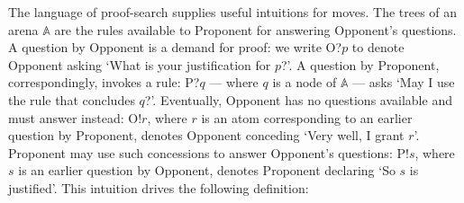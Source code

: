 \documentclass{lipics-v2021}
\newcommand{\arena}[1]{\mathbb{#1}}                     %
\begin{document}
The language of proof-search supplies useful intuitions for moves. The trees
of an arena $\arena{A}$ are the rules available to Proponent for answering
Opponent's questions. A question by Opponent is a demand for proof: we write
O?$p$ to denote Opponent asking `What is your justification for $p$?'. A
question by Proponent, correspondingly, invokes a rule: P?$q$ --- where $q$ is
a node of $\arena{A}$ --- asks `May I use the rule that concludes $q$?'.
Eventually, Opponent has no questions available and must answer instead:
O!$r$, where $r$ is an atom corresponding to an earlier question by Proponent,
denotes Opponent conceding `Very well, I grant $r$'. Proponent may use such
concessions to answer Opponent's questions: P!$s$, where $s$ is an earlier
question by Opponent, denotes Proponent declaring `So $s$ is justified'. This
intuition drives the following definition:
\end{document}
